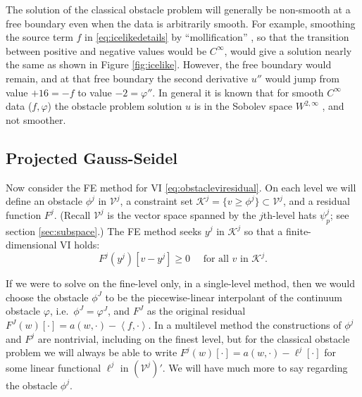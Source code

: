 \documentclass[letterpaper,final,12pt,reqno]{amsart}
\theoremstyle{claim}
\newcommand{\ip}[2]{\left<#1,#2\right>}
\numberwithin{equation}{section}
\numberwithin{figure}{section}
\numberwithin{table}{section}
\numberwithin{theorem}{section}
\begin{document}
The solution of the classical obstacle problem will generally be non-smooth at a free boundary even when the data is arbitrarily smooth.  For example, smoothing the source term $f$ in \eqref{eq:icelikedetails} by ``mollification'' \cite{Evans2010}, so that the transition between positive and negative values would be $C^\infty$, would give a solution nearly the same as shown in Figure \ref{fig:icelike}.  However, the free boundary would remain, and at that free boundary the second derivative $u''$ would jump from value $+16=-f$ to value $-2=\varphi''$.  In general it is known that for smooth $C^\infty$ data ($f,\varphi$) the obstacle problem solution $u$ is in the Sobolev space $W^{2,\infty}$ \cite[section IV.6]{KinderlehrerStampacchia1980}, and not smoother.

\subsection*{Projected Gauss-Seidel}  Now consider the FE method for VI \eqref{eq:obstacleviresidual}.  On each level we will define an obstacle $\phi^j$ in $\mathcal{V}^j$, a constraint set $\mathcal{K}^j = \{v \ge \phi^j\} \subset \mathcal{V}^j$, and a residual function $F^j$.  (Recall $\mathcal{V}^j$ is the vector space spanned by the $j$th-level hats $\psi_p^j$; see section \ref{sec:subspace}.)  The FE method seeks $y^j$ in $\mathcal{K}^j$ so that a finite-dimensional VI holds:
\begin{equation}
  F^j(y^j)[v-y^j] \ge 0 \quad \text{ for all } v \text{ in } \mathcal{K}^j. \label{eq:feobstacleviresidual}
\end{equation}

If we were to solve on the fine-level only, in a single-level method, then we would choose the obstacle $\phi^J$ to be the piecewise-linear interpolant of the continuum obstacle $\varphi$, i.e.~$\phi^J=\varphi^J$, and $F^J$ as the original residual $F^J(w)[\cdot] = a(w,\cdot) - \ip{f}{\cdot}$.  In a multilevel method the constructions of $\phi^j$ and $F^j$ are nontrivial, including on the finest level, but for the classical obstacle problem we will always be able to write $F^j(w)[\cdot] = a(w,\cdot) - \ell^j[\cdot]$ for some linear functional $\ell^j$ in $(\mathcal{V}^j)'$.  We will have much more to say regarding the obstacle $\phi^j$.
\end{document}
